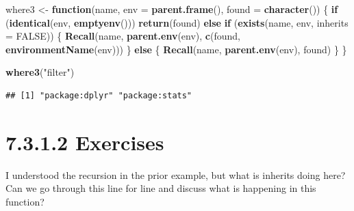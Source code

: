 \documentclass[]{book}
\newenvironment{Shaded}{\begin{snugshade}}{\end{snugshade}}
\newcommand{\ControlFlowTok}[1]{\textcolor[rgb]{0.13,0.29,0.53}{\textbf{#1}}}
\newcommand{\DataTypeTok}[1]{\textcolor[rgb]{0.13,0.29,0.53}{#1}}
\newcommand{\KeywordTok}[1]{\textcolor[rgb]{0.13,0.29,0.53}{\textbf{#1}}}
\newcommand{\NormalTok}[1]{#1}
\newcommand{\OtherTok}[1]{\textcolor[rgb]{0.56,0.35,0.01}{#1}}
\newcommand{\StringTok}[1]{\textcolor[rgb]{0.31,0.60,0.02}{#1}}
\begin{document}
\begin{Shaded}
\begin{Highlighting}[]
\NormalTok{where3 <-}\StringTok{ }\ControlFlowTok{function}\NormalTok{(name, }\DataTypeTok{env =} \KeywordTok{parent.frame}\NormalTok{(), }\DataTypeTok{found =} \KeywordTok{character}\NormalTok{()) \{}
  \ControlFlowTok{if}\NormalTok{ (}\KeywordTok{identical}\NormalTok{(env, }\KeywordTok{emptyenv}\NormalTok{()))}
    \KeywordTok{return}\NormalTok{(found)}
  \ControlFlowTok{else} \ControlFlowTok{if}\NormalTok{ (}\KeywordTok{exists}\NormalTok{(name, env, }\DataTypeTok{inherits =} \OtherTok{FALSE}\NormalTok{)) \{}
    \KeywordTok{Recall}\NormalTok{(name, }\KeywordTok{parent.env}\NormalTok{(env), }\KeywordTok{c}\NormalTok{(found, }\KeywordTok{environmentName}\NormalTok{(env)))}
\NormalTok{  \} }\ControlFlowTok{else}\NormalTok{ \{}
    \KeywordTok{Recall}\NormalTok{(name, }\KeywordTok{parent.env}\NormalTok{(env), found)}
\NormalTok{  \}}
\NormalTok{\}}
  
\KeywordTok{where3}\NormalTok{(}\StringTok{"filter"}\NormalTok{)}
\end{Highlighting}
\end{Shaded}

\begin{verbatim}
## [1] "package:dplyr" "package:stats"
\end{verbatim}

\hypertarget{exercises-3}{%
\section*{7.3.1.2 Exercises}\label{exercises-3}}

I understood the recursion in the prior example, but what is inherits doing here? Can we go through this line for line and discuss what is happening in this function?
\end{document}
